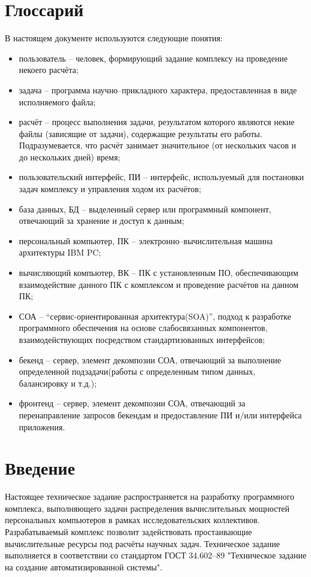 \documentclass[a4paper,12pt]{report}
\date{\today}
\numberwithin{equation}{section}
\begin{document}
\section{Глоссарий}
В настоящем документе используются следующие понятия:
\begin{itemize}
  \item пользователь -- человек, формирующий задание комплексу на проведение некоего расчёта;
  \item задача -- программа научно--прикладного характера, предоставленная в виде исполняемого файла;
  \item расчёт -- процесс выполнения задачи, результатом которого являются некие файлы (зависящие от задачи), содержащие результаты его работы. Подразумевается, что расчёт занимает значительное (от нескольких часов и до нескольких дней) время;
  \item пользовательский интерфейс, ПИ -- интерфейс, используемый для постановки задач комплексу и управления ходом их расчётов;
  \item база данных, БД -- выделенный сервер или программный компонент, отвечающий за хранение и доступ к данным;
  \item персональный компьютер, ПК -- электронно--вычислительная машина архитектуры IBM PC;
  \item вычисляющий компьютер, ВК -- ПК с установленным ПО, обеспечивающим взаимодействие данного ПК с комплексом и проведение расчётов на данном ПК;
  \item СОА -- ``сервис-ориентированная архитектура(SOA)'', подход к разработке программного обеспечения на основе слабосвязанных компонентов, взаимодействующих посредством стандартизованных интерфейсов;
  \item бекенд -- сервер, элемент декомпозии СОА, отвечающий за выполнение определенной подзадачи(работы с определенным типом данных, балансировку и т.д.);
  \item фронтенд -- сервер, элемент декомпозии СОА, отвечающий за перенаправление запросов бекендам и предоставление ПИ и/или интерфейса приложения.
\end{itemize}

\section{Введение}

Настоящее техническое задание распространяется на разработку программного комплекса, выполняющего задачи распределения вычислительных мощностей персональных компьютеров в рамках исследовательских коллективов. Разрабатываемый комплекс позволит задействовать простаивающие вычислительные ресурсы под расчёты научных задач. Техническое задание выполняется в соответствии со стандартом ГОСТ 34.602--89 "Техническое задание на создание автоматизированной системы".
\end{document}
